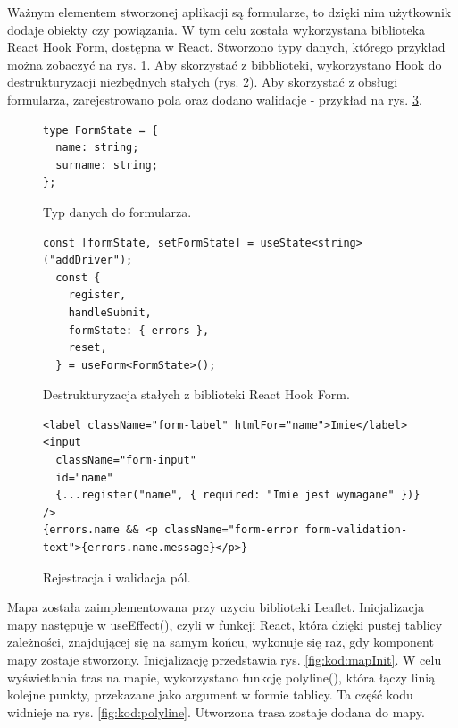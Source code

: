 Ważnym elementem stworzonej aplikacji są formularze, to dzięki nim użytkownik dodaje obiekty czy powiązania. W tym celu została wykorzystana biblioteka React Hook Form, dostępna w React. Stworzono typy danych, którego przykład można zobaczyć na rys. \ref{fig:kod:formType}. Aby skorzystać z bibblioteki, wykorzystano Hook do destrukturyzacji niezbędnych stałych (rys. \ref{fig:kod:consts}). Aby skorzystać z obsługi formularza, zarejestrowano pola oraz dodano walidacje - przykład na rys. \ref{fig:kod:register}.

\begin{figure}
\centering
\begin{lstlisting}
type FormState = {
  name: string;
  surname: string;
};
\end{lstlisting}
\caption{Typ danych do formularza.}
\label{fig:kod:formType}
\end{figure}

\begin{figure}
\centering
\begin{lstlisting}
const [formState, setFormState] = useState<string>("addDriver");
  const {
    register,
    handleSubmit,
    formState: { errors },
    reset,
  } = useForm<FormState>();
\end{lstlisting}
\caption{Destrukturyzacja stałych z biblioteki React Hook Form.}
\label{fig:kod:consts}
\end{figure}

\begin{figure}
\centering
\begin{lstlisting}
<label className="form-label" htmlFor="name">Imie</label>
<input
  className="form-input"
  id="name"
  {...register("name", { required: "Imie jest wymagane" })}
/>
{errors.name && <p className="form-error form-validation-text">{errors.name.message}</p>}
\end{lstlisting}
\caption{Rejestracja i walidacja pól.}
\label{fig:kod:register}
\end{figure}

Mapa została zaimplementowana przy uzyciu biblioteki Leaflet. Inicjalizacja mapy następuje w useEffect(), czyli w funkcji React, która dzięki pustej tablicy zależności, znajdującej się na samym końcu, wykonuje się raz, gdy komponent mapy zostaje stworzony. Inicjalizację przedstawia rys. \ref{fig:kod:mapInit}. W celu wyświetlania tras na mapie, wykorzystano funkcję polyline(), która łączy linią kolejne punkty, przekazane jako argument w formie tablicy. Ta część kodu widnieje na rys. \ref{fig:kod:polyline}. Utworzona trasa zostaje dodana do mapy. 

